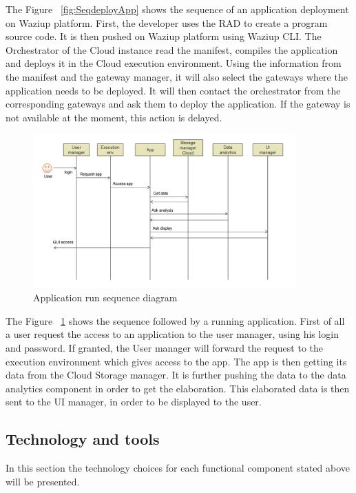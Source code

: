 The Figure ~\ref{fig:SeqdeployApp} shows the sequence of an application deployment on Waziup platform. First, the developer uses the RAD to create a program source code. It is then pushed on Waziup platform using Waziup CLI. The Orchestrator of the Cloud instance read the manifest, compiles the application and deploys it in the Cloud execution environment. Using the information from the manifest and the gateway manager, it will also select the gateways where the application needs to be deployed. It will then contact the orchestrator from the corresponding gateways and ask them to deploy the application. If the gateway is not available at the moment, this action is delayed.

\begin{figure}[h!]
\centering
\includegraphics[width=0.9\textwidth]{figs/seqRunApp.png}
\caption{Application run sequence diagram}
\label{fig:seqRunApp}
\end{figure}

The Figure ~\ref{fig:seqRunApp} shows the sequence followed by a running application. First of all a user request the access to an application to the user manager, using his login and password. If granted, the User manager will forward the request to the execution environment which gives access to the app. The app is then getting its data from the Cloud Storage manager. It is further pushing the data to the data analytics component in order to get the elaboration. This elaborated data is then sent to the UI manager, in order to be displayed to the user.

\subsection{Technology and tools}

In this section the technology choices for each functional component stated above will be presented.
